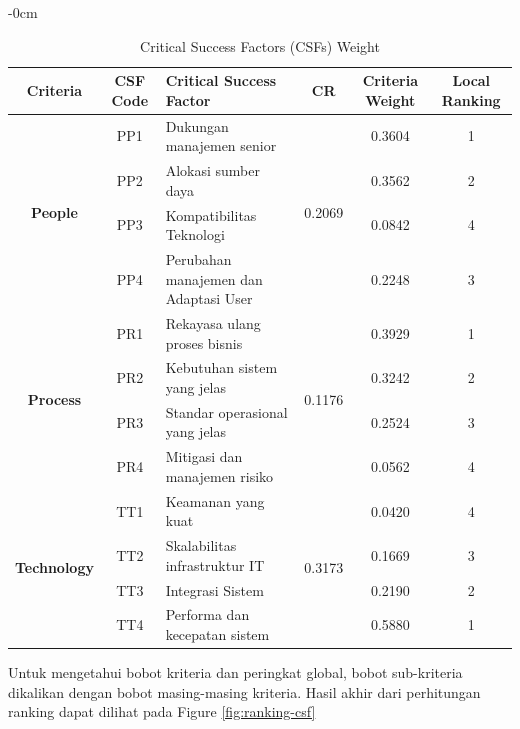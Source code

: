 \documentclass[journal,article,submit,pdftex,moreauthors]{Definitions/mdpi}
\begin{document}
\begin{table}[H]
\begin{adjustwidth}{-\extralength}{0cm}
    \caption{Critical Success Factors (CSFs) Weight}
    \label{tab:csf-table}
    \centering
    \begin{tabular}{c|c|p{7cm}|c|c|c}
        \toprule
        \textbf{Criteria} & \textbf{CSF Code} & \textbf{Critical Success Factor} & \textbf{CR} & \textbf{Criteria Weight} & \textbf{Local Ranking} \\ 
        \midrule
        \multirow{4}{*}{\textbf{People}} 
        & PP1 & Dukungan manajemen senior & \multirow{4}{*}{0.2069} & 0.3604 & 1 \\ \cline{2-3} \cline{5-6}
        & PP2 & Alokasi sumber daya &  & 0.3562 & 2 \\ \cline{2-3} \cline{5-6}
        & PP3 & Kompatibilitas Teknologi &  & 0.0842 & 4 \\ \cline{2-3} \cline{5-6}
        & PP4 & Perubahan manajemen dan Adaptasi User &  & 0.2248 & 3 \\ 
        \midrule
        \multirow{4}{*}{\textbf{Process}} 
        & PR1 & Rekayasa ulang proses bisnis & \multirow{4}{*}{0.1176} & 0.3929 & 1 \\ \cline{2-3} \cline{5-6}
        & PR2 & Kebutuhan sistem yang jelas &  & 0.3242 & 2 \\ \cline{2-3} \cline{5-6}
        & PR3 & Standar operasional yang jelas &  & 0.2524 & 3 \\ \cline{2-3} \cline{5-6}
        & PR4 & Mitigasi dan manajemen risiko &  & 0.0562 & 4 \\ 
        \midrule 
        \multirow{4}{*}{\textbf{Technology}} 
        & TT1 & Keamanan yang kuat & \multirow{4}{*}{0.3173} & 0.0420 & 4 \\ \cline{2-3} \cline{5-6}
        & TT2 & Skalabilitas infrastruktur IT &  & 0.1669 & 3 \\ \cline{2-3} \cline{5-6}
        & TT3 & Integrasi Sistem &  & 0.2190 & 2 \\ \cline{2-3} \cline{5-6}
        & TT4 & Performa dan kecepatan sistem &  & 0.5880 & 1 \\ 
        \bottomrule
    \end{tabular}
\end{adjustwidth}
\end{table}

Untuk mengetahui bobot kriteria dan peringkat global, bobot sub-kriteria dikalikan dengan bobot masing-masing kriteria. Hasil akhir dari perhitungan ranking dapat dilihat pada Figure \ref{fig:ranking-csf}
\end{document}
